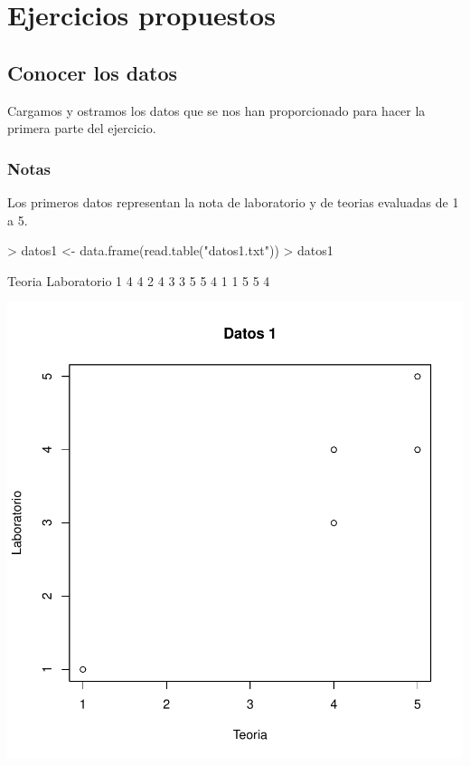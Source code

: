 \documentclass [a4paper] {article}
\begin{document}
\newpage
\tableofcontents


\newpage
\section{Ejercicios propuestos}
\subsection{Conocer los datos}
Cargamos y ostramos los datos que se nos han proporcionado para hacer la primera parte del ejercicio.

\subsubsection{Notas}
Los primeros datos representan la nota de laboratorio y de teorias evaluadas de 1 a 5.
\begin{Schunk}
\begin{Sinput}
> datos1 <- data.frame(read.table("datos1.txt"))
> datos1
\end{Sinput}
\begin{Soutput}
  Teoria Laboratorio
1      4           4
2      4           3
3      5           5
4      1           1
5      5           4
\end{Soutput}
\end{Schunk}
\begin{center}
\includegraphics{entrega-plot_datos1}
\end{center}
\end{document}
